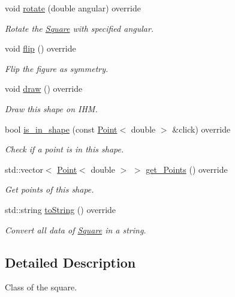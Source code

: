 \begin{DoxyCompactItemize}
void \hyperlink{classSquare_a5714e182c30f996b78e74e1badd054a2}{rotate} (double angular) override
\begin{DoxyCompactList}\small\item\em Rotate the \hyperlink{classSquare}{Square} with specified angular. \end{DoxyCompactList}\item 
\mbox{\label{classSquare_a2d56ff842244af8f2fdc85b7e5ce76f3}} 
void \hyperlink{classSquare_a2d56ff842244af8f2fdc85b7e5ce76f3}{flip} () override
\begin{DoxyCompactList}\small\item\em Flip the figure as symmetry. \end{DoxyCompactList}\item 
\mbox{\label{classSquare_a4edbdf9ae0519cc1823f4dbbaa6bbf4c}} 
void \hyperlink{classSquare_a4edbdf9ae0519cc1823f4dbbaa6bbf4c}{draw} () override
\begin{DoxyCompactList}\small\item\em Draw this shape on I\+HM. \end{DoxyCompactList}\item 
bool \hyperlink{classSquare_ada046df2d9fb92286d106d4b3475980a}{is\+\_\+in\+\_\+shape} (const \hyperlink{classPoint}{Point}$<$ double $>$ \&click) override
\begin{DoxyCompactList}\small\item\em Check if a point is in this shape. \end{DoxyCompactList}\item 
std\+::vector$<$ \hyperlink{classPoint}{Point}$<$ double $>$ $>$ \hyperlink{classSquare_a2a8fb1bfd2f3464cee813ec8b277506e}{get\+\_\+\+Points} () override
\begin{DoxyCompactList}\small\item\em Get points of this shape. \end{DoxyCompactList}\item 
std\+::string \hyperlink{classSquare_aa5d7db8004bba3c400f57513d93b21d4}{to\+String} () override
\begin{DoxyCompactList}\small\item\em Convert all data of \hyperlink{classSquare}{Square} in a string. \end{DoxyCompactList}\end{DoxyCompactItemize}


\subsection{Detailed Description}
Class of the square. 

